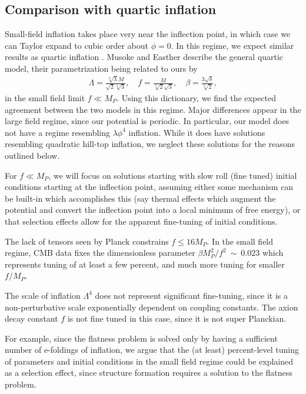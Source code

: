 \documentclass[aps,amsfonts,amsmath,prd,preprint,nofootinbib,superscriptaddress]{revtex4}
\newcommand{\Mp}{{M_{P}}}
\newcommand{\MMp}{{M_P^2}}
\begin{document}
\subsection{Comparison with quartic inflation}
Small-field inflation takes place very near the inflection point, in which case we can Taylor expand to cubic order about $\phi=0$. 
In this regime, we expect similar results as quartic inflation \cite{quartic}.  Musoke and Easther \cite{Musoke:2017frr} describe the general quartic model, their parametrization being related to ours by
\begin{align}
\Lambda = \frac{\sqrt[4]{\lambda } M}{\sqrt{2} \sqrt[4]{3}}, \quad f = \frac{M}{\sqrt[3]{2} \sqrt{3}}, \quad \beta = \frac{3 \sqrt{\delta}}{\sqrt[6]{2}},
\end{align}
in the small field limit $f \ll \Mp$.  Using this dictionary, we find the expected agreement between the two models in this regime.
Major differences appear in the large field regime, since our potential is periodic.  In particular, our model does not have a regime resembling $\lambda \phi^4$ inflation.  While it does
have solutions resembling quadratic hill-top inflation, we neglect these solutions for the reasons outlined below.

For $f \ll \Mp$, we will focus on solutions starting with slow roll (fine tuned) initial conditions starting at the inflection point, assuming either some mechanism can be built-in which accomplishes
this (say thermal effects which augment the potential and convert the inflection point into a local minimum of free energy), or that selection effects allow for the apparent fine-tuning of
initial conditions.

The lack of tensors seen by Planck constrains $f \leq 16\Mp$.  In the small field regime, CMB data fixes the dimensionless parameter $\beta \MMp/f^2~\sim~0.023$ which represents tuning of at least a few percent, and much more tuning for smaller $f/\Mp$.  

The scale of inflation $\Lambda^4$ does not represent significant fine-tuning, since it is a non-perturbative scale exponentially dependent on coupling constants.  
The axion decay constant $f$ is not fine tuned in this case, since it is not super Planckian.


For example, since the flatness problem is solved only by having a sufficient number of e-foldings of inflation, we argue that the (at least) percent-level tuning of parameters and initial conditions in
the small field regime could be explained as a selection effect, since structure formation requires a solution to the flatness problem.
\end{document}
